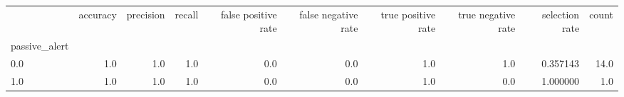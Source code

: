 \begin{tabular}{lrrrrrrrrr}
\toprule
{} &  accuracy &  precision &  recall &  false positive rate &  false negative rate &  true positive rate &  true negative rate &  selection rate &  count \\
passive\_alert &           &            &         &                      &                      &                     &                     &                 &        \\
\midrule
0.0           &       1.0 &        1.0 &     1.0 &                  0.0 &                  0.0 &                 1.0 &                 1.0 &        0.357143 &   14.0 \\
1.0           &       1.0 &        1.0 &     1.0 &                  0.0 &                  0.0 &                 1.0 &                 0.0 &        1.000000 &    1.0 \\
\bottomrule
\end{tabular}

